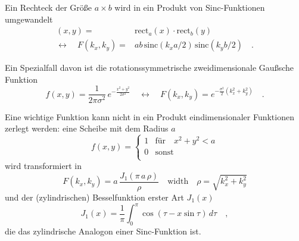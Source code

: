 Ein Rechteck der Größe $a \times b$ wird in ein Produkt von Sinc-Funktionen umgewandelt
\begin{align}
  (x,y) = & \text{rect} _a (x) \cdot \text{rect} _b (y) \\
  \leftrightarrow \quad  F(k_x, k_y) = & a b \, \text{sinc}( k_x a /2) \, \text{sinc}( k_y b /2) \quad .
\end{align}


Ein Spezialfall davon ist die rotationssymmetrische zweidimensionale Gaußsche Funktion
\begin{equation}
  f(x,y) = 
  \frac{1}{2 \pi \sigma^2} \, e^{-  \frac{x^2 + y^2}{2 \sigma^2} }
  \quad \leftrightarrow \quad 
  F(k_x, k_y) = e^{- \frac{\sigma^2 }{2} \left(k_x^2 + k_y^2 \right)  } \quad .
\end{equation}

Eine wichtige Funktion kann nicht in ein Produkt eindimensionaler Funktionen zerlegt werden: eine Scheibe mit dem Radius $a$
    \begin{equation}
    f(x,y)  = \left\{ 
    \begin{array}{ll}
    1 & \text{für} \quad x^2+y^2 < a \\
    0 & \text{sonst} \\
    \end{array}
    \right.
   \end{equation}
   wird transformiert in
\begin{equation}
  F(k_x, k_y) = a \, \frac{J_1(\pi \, a \, \rho )}{\rho}
  \quad \text{width} \quad \rho = \sqrt{k_x^2 + k_y^2}
\end{equation}
und der (zylindrischen) Besselfunktion erster Art $J_1(x)$
\begin{equation}
  J_1(x) = \frac{1}{\pi} \int_0^\pi \cos (\tau - x \sin \tau) \,d\tau \quad ,
\end{equation}
die das zylindrische Analogon einer Sinc-Funktion ist.

\printbibliography[segment=\therefsegment,heading=subbibliography]
